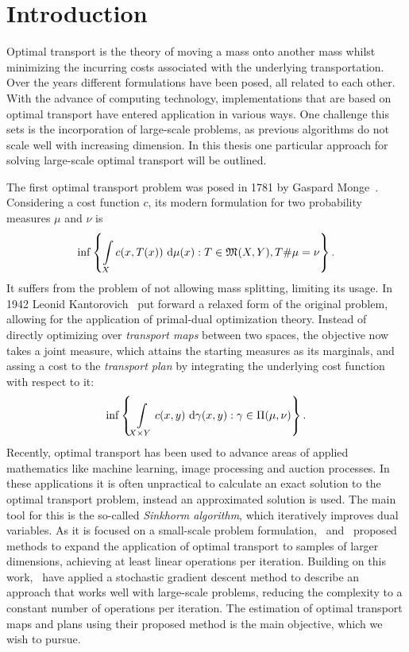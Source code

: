 \chapter*{Introduction}

Optimal transport is the theory of moving a mass onto another mass whilst minimizing the incurring costs associated with the underlying transportation. Over the years different formulations have been posed, all related to each other. With the advance of computing technology, implementations that are based on optimal transport have entered application in various ways. One challenge this sets is the incorporation of large-scale problems, as previous algorithms do not scale well with increasing dimension. In this thesis one particular approach for solving large-scale optimal transport will be outlined.

The first optimal transport problem was posed in 1781 by Gaspard Monge\ \cite{Mon1781}. Considering a cost function $c$, its modern formulation for two probability measures $\mu$ and $\nu$ is
\[ \inf \left\{ \int\limits_X c(x, T(x))~\Dx{\mu} : T \in \MF{X}{Y}, \push{\mu} = \nu \right\}. \]
It suffers from the problem of not allowing mass splitting, limiting its usage. In 1942 Leonid Kantorovich\ \cite{Kan1942} put forward a relaxed form of the original problem, allowing for the application of primal-dual optimization theory. Instead of directly optimizing over \textit{transport maps} between two spaces, the objective now takes a joint measure, which attains the starting measures as its marginals, and assing a cost to the \textit{transport plan} by integrating the underlying cost function with respect to it:
\[ \inf \left\{ \int\limits_{X \times Y} c(x, y)~\Dx[x, y]{\gamma} : \gamma \in \TP{\mu}{\nu} \right\}. \]
Recently, optimal transport has been used to advance areas of applied mathematics like machine learning, image processing and auction processes. In these applications it is often unpractical to calculate an exact solution to the optimal transport problem, instead an approximated solution is used. The main tool for this is the so-called \textit{Sinkhorm algorithm}, which iteratively improves dual variables. As it is focused on a small-scale problem formulation,\ \cite{Gene2016} and\ \cite{Arjo2017} proposed methods to expand the application of optimal transport to samples of larger dimensions, achieving at least linear operations per iteration. Building on this work,\ \cite{Seg2018} have applied a stochastic gradient descent method to describe an approach that works well with large-scale problems, reducing the complexity to a constant number of operations per iteration. The estimation of optimal transport maps and plans using their proposed method is the main objective, which we wish to pursue.

